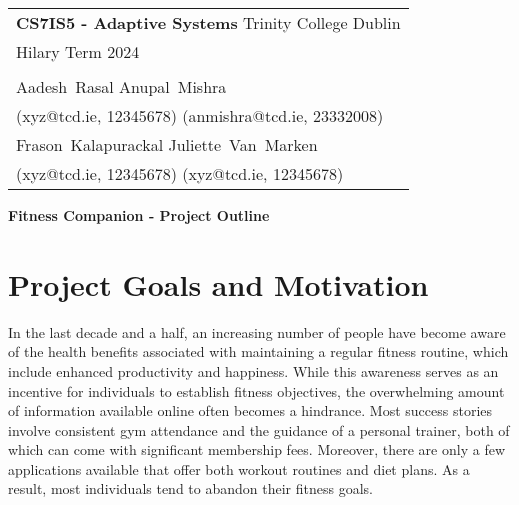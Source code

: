\documentclass[a4paper,10pt]{article}
\begin{document}
\thispagestyle{empty}
\textcolor{darkblue}{
    \begin{tabular}{p{17.5cm}}
        {\large \bf CS7IS5 - Adaptive Systems} \hfill Trinity College Dublin \\
        \hfill Hilary Term 2024 \\
        \\
        \hline
        \vspace*{0.05cm}
         Aadesh\ Rasal \hfill Anupal\ Mishra        \\
         (xyz@tcd.ie, 12345678) \hfill (anmishra@tcd.ie, 23332008) \\
         \vspace*{0.02cm}
         Frason\ Kalapurackal \hfill Juliette\ Van\ Marken        \\
         (xyz@tcd.ie, 12345678) \hfill (xyz@tcd.ie, 12345678) \\
    \end{tabular}
}
\vspace*{0.2cm}

\begin{center}
    {\Large \bf Fitness Companion - Project Outline}
    \vspace{2mm}
\end{center}

\tableofcontents

\section{Project Goals and Motivation}


In the last decade and a half, an increasing number of people have become aware of the health benefits associated with maintaining a regular fitness routine, which include enhanced productivity and happiness.
While this awareness serves as an incentive for individuals to establish fitness objectives, the overwhelming amount of information available online often becomes a hindrance.
Most success stories involve consistent gym attendance and the guidance of a personal trainer, both of which can come with significant membership fees.
Moreover, there are only a few applications available that offer both workout routines and diet plans.
As a result, most individuals tend to abandon their fitness goals.
\end{document}
